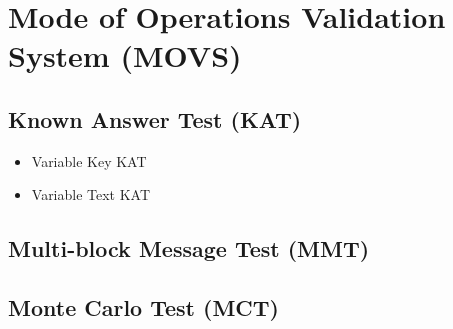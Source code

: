 \chapter{Mode of Operations Validation System (MOVS)}

\section{Known Answer Test (KAT)}
\begin{itemize}
	\item Variable Key KAT
	\item Variable Text KAT
\end{itemize}
\section{Multi-block Message Test (MMT)}
\section{Monte Carlo Test (MCT)}
